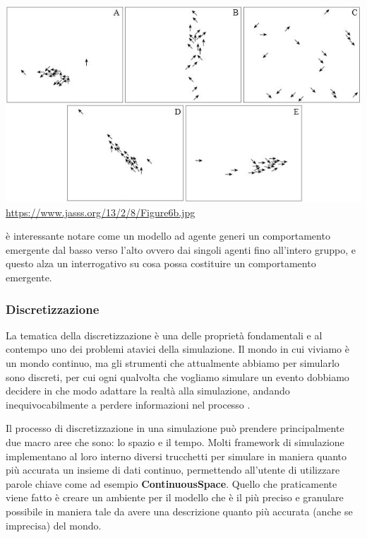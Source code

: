 \begin{minipage}{\linewidth}
    \centering
    \includegraphics{img/Figure6b.jpg}
    \url{https://www.jasss.org/13/2/8/Figure6b.jpg}
    \label{fig:flock_emergent_behaviour}
\end{minipage}

è interessante notare come un modello ad agente generi un comportamento emergente dal basso 
verso l'alto ovvero dai singoli agenti fino all'intero gruppo, e questo alza un interrogativo 
su cosa possa costituire un comportamento emergente. 

\subsubsection{Discretizzazione}
La tematica della discretizzazione è una delle proprietà fondamentali
e al contempo uno dei problemi atavici della simulazione.
Il mondo in cui viviamo è un mondo continuo, ma gli strumenti
che attualmente abbiamo per simularlo sono discreti, per cui 
ogni qualvolta che vogliamo simulare un evento dobbiamo decidere 
in che modo adattare la realtà alla simulazione, andando 
inequivocabilmente a perdere informazioni nel processo 
\cite{KONSTANTINOUDIS2020100319}. 

Il processo di discretizzazione in una simulazione può prendere 
principalmente due macro aree che sono: lo spazio e il tempo. 
Molti framework di simulazione implementano al loro interno 
diversi trucchetti per simulare in maniera quanto più accurata
un insieme di dati continuo, permettendo all'utente di utilizzare
parole chiave come ad esempio \textbf{ContinuousSpace}. Quello che praticamente
viene fatto è creare un ambiente per il modello che è il più
preciso e granulare possibile in maniera tale da avere una descrizione
quanto più accurata (anche se imprecisa) del mondo. 

